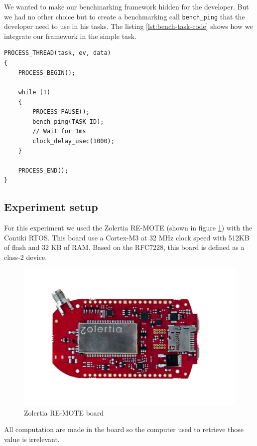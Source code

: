 We wanted to make our benchmarking framework hidden for the developer.
But we had no other choice but to create a benchmarking call \texttt{bench\_ping} that the developer need to use in his tasks.
The listing \ref{lst:bench-task-code} shows how we integrate our framework in the simple task.

\begin{lstlisting}[style=CStyle, label={lst:bench-task-code}, caption={Source code of the task with benchmarking framework calls}]
PROCESS_THREAD(task, ev, data)
{
    PROCESS_BEGIN();

    while (1)
    {
        PROCESS_PAUSE();
        bench_ping(TASK_ID);
        // Wait for 1ms
        clock_delay_usec(1000);
    }

    PROCESS_END();
}
\end{lstlisting}

\subsection{\label{sec:internal-setup}Experiment setup}

For this experiment we used the Zolertia RE-MOTE (shown in figure \ref{fig:remote}) with the Contiki RTOS.
This board use a Cortex-M3 at 32 MHz clock speed with 512KB of flash and 32 KB of RAM.
Based on the RFC7228, this board is defined as a class-2 device.

\begin{figure}
  \centering
  \includegraphics[scale=0.7]{assets/remote.png}
  \caption{\label{fig:remote}Zolertia RE-MOTE board}
\end{figure}

All computation are made in the board so the computer used to retrieve those value is irrelevant.